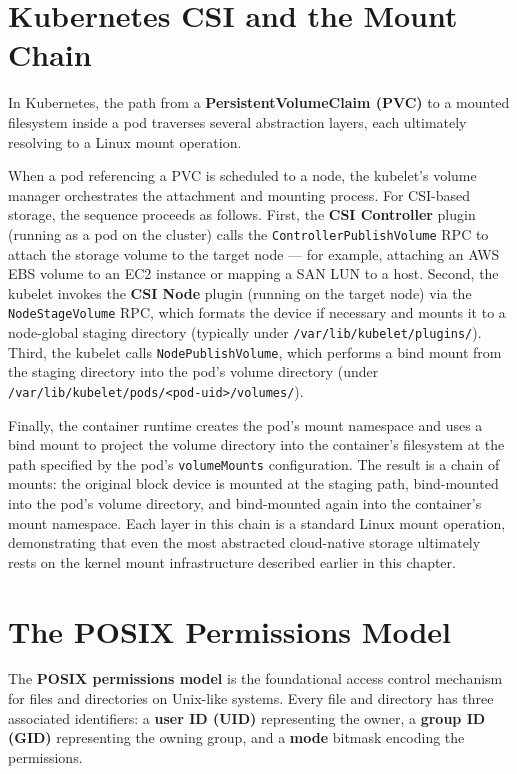 \section{Kubernetes CSI and the Mount Chain}

In Kubernetes, the path from a \textbf{PersistentVolumeClaim (PVC)} to a mounted filesystem inside a pod traverses several abstraction layers, each ultimately resolving to a Linux mount operation.

When a pod referencing a PVC is scheduled to a node, the kubelet's volume manager orchestrates the attachment and mounting process. For CSI-based storage, the sequence proceeds as follows. First, the \textbf{CSI Controller} plugin (running as a pod on the cluster) calls the \texttt{ControllerPublishVolume} RPC to attach the storage volume to the target node --- for example, attaching an AWS EBS volume to an EC2 instance or mapping a SAN LUN to a host. Second, the kubelet invokes the \textbf{CSI Node} plugin (running on the target node) via the \texttt{NodeStageVolume} RPC, which formats the device if necessary and mounts it to a node-global staging directory (typically under \texttt{/var/lib/kubelet/plugins/}). Third, the kubelet calls \texttt{NodePublishVolume}, which performs a bind mount from the staging directory into the pod's volume directory (under \texttt{/var/lib/kubelet/pods/<pod-uid>/volumes/}).

Finally, the container runtime creates the pod's mount namespace and uses a bind mount to project the volume directory into the container's filesystem at the path specified by the pod's \texttt{volumeMounts} configuration. The result is a chain of mounts: the original block device is mounted at the staging path, bind-mounted into the pod's volume directory, and bind-mounted again into the container's mount namespace. Each layer in this chain is a standard Linux mount operation, demonstrating that even the most abstracted cloud-native storage ultimately rests on the kernel mount infrastructure described earlier in this chapter.

\section{The POSIX Permissions Model}

The \textbf{POSIX permissions model} is the foundational access control mechanism for files and directories on Unix-like systems. Every file and directory has three associated identifiers: a \textbf{user ID (UID)} representing the owner, a \textbf{group ID (GID)} representing the owning group, and a \textbf{mode} bitmask encoding the permissions.

